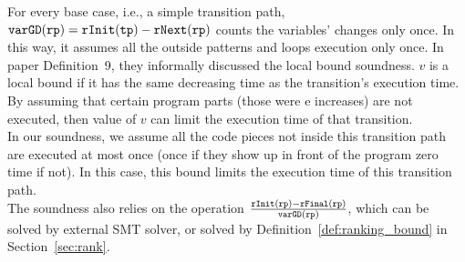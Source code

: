   For every base case, i.e., a simple transition path, 
$\mathtt{varGD}(\mathtt{rp}) =  \mathtt{rInit}(\mathtt{tp}) - \mathtt{rNext}(\mathtt{rp})$
counts the variables' changes only once. In this way, it assumes all the outside patterns and loops execution only once.
In paper \cite{sinn2017complexity} Definition~9, they informally discussed the local bound soundness.
$v$ is a local bound if it has the same decreasing time as the transition's execution time.
By assuming that certain program parts (those were e increases) are not executed,
then value of $v$ can limit the execution time of that transition.
\\
In our soundness, we assume all the code pieces not inside this transition path are executed at most once (once if they show up in front of the program
zero time if not).
In this case, this bound limits the execution time of this transition path.
\\
The soundness also relies on the operation $\frac{\mathtt{rInit}(\mathtt{rp}) - \mathtt{rFinal}(\mathtt{rp})}{\mathtt{varGD}(\mathtt{rp})}$,
which can be solved by external SMT solver,
or solved by Definition~\ref{def:ranking_bound} in Section~\ref{sec:rank}.

